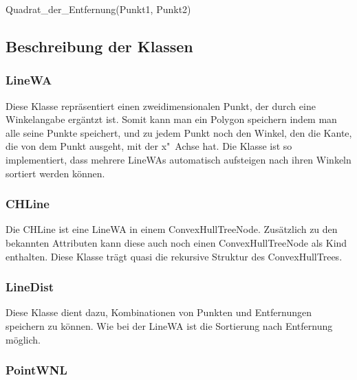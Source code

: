 \begin{function}[!ht]
	\caption{Quadrat\_der\_Entfernung(Punkt1, Punkt2)}
\end{function}


\clearpage
\subsection{Beschreibung der Klassen}\label{klassen}

\subsubsection{LineWA}

Diese Klasse repräsentiert einen zweidimensionalen Punkt, der durch eine Winkelangabe ergäntzt ist. Somit kann man ein Polygon speichern indem man alle seine Punkte speichert, und zu jedem Punkt noch den Winkel, den die Kante, die von dem Punkt ausgeht, mit der x"~Achse hat. Die Klasse ist so implementiert, dass mehrere LineWAs automatisch aufsteigen nach ihren Winkeln sortiert werden können.

\subsubsection{CHLine}

Die CHLine ist eine LineWA in einem ConvexHullTreeNode. Zusätzlich zu den bekannten Attributen kann diese auch noch einen ConvexHullTreeNode als Kind enthalten. Diese Klasse trägt quasi die rekursive Struktur des ConvexHullTrees.

\subsubsection{LineDist}

Diese Klasse dient dazu, Kombinationen von Punkten und Entfernungen speichern zu können. Wie bei der LineWA ist die Sortierung nach Entfernung möglich.

\subsubsection{PointWNL}

